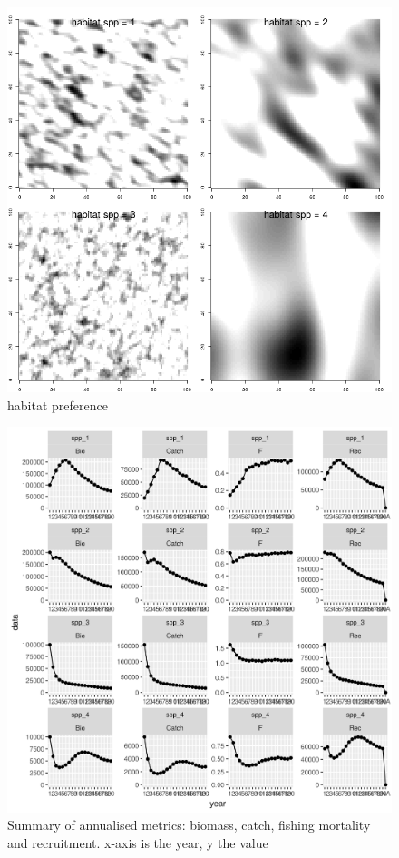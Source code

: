 \documentclass[review]{elsarticle}
\begin{document}
\begin{figure}[!ht]
	\includegraphics[width = \linewidth]{../tests/plots/habitat}
	\caption{habitat preference}
	\label{fig:1}
\end{figure}	

\begin{figure}[!ht]
	\includegraphics[width = \linewidth]{../tests/plots/annual_summary}
	\caption{Summary of annualised metrics: biomass, catch, fishing
		mortality and recruitment. x-axis is the year, y the value}
	\label{fig:2}
\end{figure}	
\end{document}
